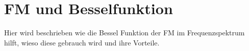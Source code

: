 %
%
%
\section{FM und Besselfunktion 
\label{fm:section:teil2}}

Hier wird beschrieben wie die Bessel Funktion der FM im Frequenzspektrum hilft, wieso diese gebrauch wird und ihre Vorteile.
%



